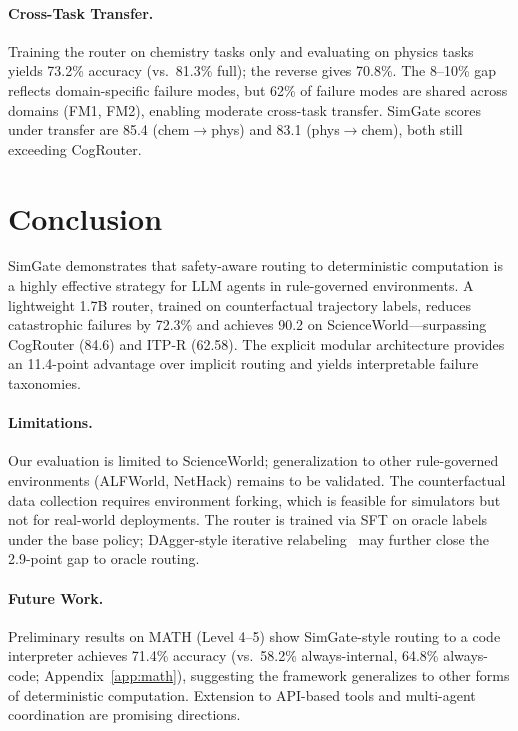 \documentclass[11pt,a4paper]{article}
\begin{document}
\paragraph{Cross-Task Transfer.}
Training the router on chemistry tasks only and evaluating on physics tasks yields 73.2\% accuracy (vs.\ 81.3\% full); the reverse gives 70.8\%.
The 8--10\% gap reflects domain-specific failure modes, but 62\% of failure modes are shared across domains (FM1, FM2), enabling moderate cross-task transfer.
SimGate scores under transfer are 85.4 (chem$\to$phys) and 83.1 (phys$\to$chem), both still exceeding CogRouter.

\section{Conclusion}

SimGate demonstrates that safety-aware routing to deterministic computation is a highly effective strategy for LLM agents in rule-governed environments.
A lightweight 1.7B router, trained on counterfactual trajectory labels, reduces catastrophic failures by 72.3\% and achieves 90.2 on ScienceWorld---surpassing CogRouter (84.6) and ITP-R (62.58).
The explicit modular architecture provides an 11.4-point advantage over implicit routing and yields interpretable failure taxonomies.

\paragraph{Limitations.}
Our evaluation is limited to ScienceWorld; generalization to other rule-governed environments (ALFWorld, NetHack) remains to be validated.
The counterfactual data collection requires environment forking, which is feasible for simulators but not for real-world deployments.
The router is trained via SFT on oracle labels under the base policy; DAgger-style iterative relabeling~\cite{ross2011reduction} may further close the 2.9-point gap to oracle routing.

\paragraph{Future Work.}
Preliminary results on MATH (Level 4--5) show SimGate-style routing to a code interpreter achieves 71.4\% accuracy (vs.\ 58.2\% always-internal, 64.8\% always-code; Appendix~\ref{app:math}), suggesting the framework generalizes to other forms of deterministic computation.
Extension to API-based tools and multi-agent coordination are promising directions.
\end{document}
